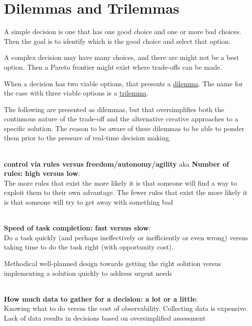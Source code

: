 \section{Dilemmas and Trilemmas\label{sec:dilemma_trilemma}}

A simple decision is one that has one good choice and one or more bad choices. Then the goal is to identify which is the good choice and select that option.

A complex decision may have many choices, and there are might not be a best option. Then a Pareto frontier might exist where trade-offs can be made. 

When a decision has two viable options, that presents a \href{https://en.wikipedia.org/wiki/Dilemma}{dilemma}. The name for the case with three viable options is a \href{https://en.wikipedia.org/wiki/Trilemma}{trilemma}.

The following are presented as dilemmas, but that oversimplifies both the continuous nature of the trade-off and the alternative creative approaches to a specific solution. The reason to be aware of these dilemmas to be able to ponder them prior to the pressure of real-time decision making. 

\ \\


\textbf{control via rules versus freedom/autonomy/agility} aka
\textbf{Number of rules: high versus low}:\\
The more rules that exist the more likely it is that someone will find a way to exploit them to their own advantage.
The fewer rules that exist the more likely it is that someone will try to get away with something bad


\ \\

\textbf{Speed of task completion: fast versus slow}:\\
Do a task quickly (and perhaps ineffectively or inefficiently or even wrong) versus taking time to do the task right (with opportunity cost).

Methodical well-planned design towards getting the right solution versus implementing a solution quickly to address urgent needs


\ \\

\textbf{How much data to gather for a decision: a lot or a little}:\\
Knowing what to do versus the cost of observability. Collecting data is expensive. Lack of data results in decisions based on oversimplified assessment

